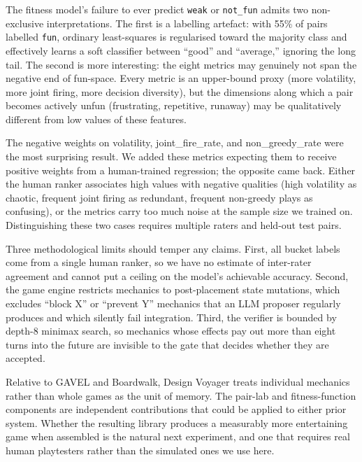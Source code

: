 \documentclass[conference]{IEEEtran}
\begin{document}
  The fitness model's failure to ever predict \texttt{weak} or \texttt{not\_fun}
   admits two non-exclusive interpretations. The first is a labelling artefact: 
  with 55\% of pairs labelled \texttt{fun}, ordinary least-squares is
  regularised toward the majority class and effectively learns a soft classifier
   between ``good'' and ``average,'' ignoring the long tail. The second is more
  interesting: the eight metrics may genuinely not span the negative end of
  fun-space. Every metric is an upper-bound proxy (more volatility, more joint  
  firing, more decision diversity), but the dimensions along which a pair
  becomes actively unfun (frustrating, repetitive, runaway) may be qualitatively
   different from low values of these features.                               
                                                                                
  The negative weights on volatility, joint\_fire\_rate, and non\_greedy\_rate
  were the most surprising result. We added these metrics expecting them to
  receive positive weights from a human-trained regression; the opposite came
  back. Either the human ranker associates high values with negative qualities
  (high volatility as chaotic, frequent joint firing as redundant, frequent
  non-greedy plays as confusing), or the metrics carry too much noise at the
  sample size we trained on. Distinguishing these two cases requires multiple
  raters and held-out test pairs.
                                                                                
  Three methodological limits should temper any claims. First, all bucket labels
   come from a single human ranker, so we have no estimate of inter-rater       
  agreement and cannot put a ceiling on the model's achievable accuracy. Second,
   the game engine restricts mechanics to post-placement state mutations, which
  excludes ``block X'' or ``prevent Y'' mechanics that an LLM proposer regularly
   produces and which silently fail integration. Third, the verifier is bounded
  by depth-8 minimax search, so mechanics whose effects pay out more than eight
  turns into the future are invisible to the gate that decides whether they are
  accepted.                                                                     
   
  Relative to GAVEL and Boardwalk, Design Voyager treats individual mechanics   
  rather than whole games as the unit of memory. The pair-lab and             
  fitness-function components are independent contributions that could be
  applied to either prior system. Whether the resulting library produces a
  measurably more entertaining game when assembled is the natural next
  experiment, and one that requires real human playtesters rather than the
  simulated ones we use here.
\end{document}
